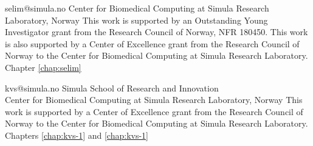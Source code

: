 
             {selim@simula.no}
             {Center for Biomedical Computing at Simula Research Laboratory, Norway}
             {This work is supported by an Outstanding Young
              Investigator grant from the Research Council of Norway,
              NFR 180450. This work is also supported by a Center of
              Excellence grant from the Research Council of Norway to
              the Center for Biomedical Computing at Simula Research
              Laboratory.}
             {Chapter \ref{chap:selim}}




             {kvs@simula.no}
             {Simula School of Research and Innovation \\
              Center for Biomedical Computing at Simula Research Laboratory, Norway}
             {This work is supported by a Center of Excellence grant
              from the Research Council of Norway to the Center for
              Biomedical Computing at Simula Research Laboratory.}
             {Chapters \ref{chap:kvs-1} and \ref{chap:kvs-1}}





